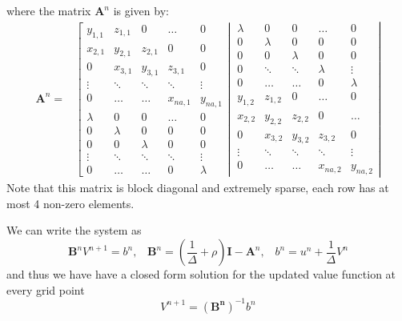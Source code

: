 \documentclass[12pt]{article}
\DeclareMathOperator{\1}{\mathbbm{1}}
\begin{document}
where the matrix $\mathbf{A}^n$ is given by:
\begin{align}\label{eq:sparseA}
	\mathbf{A}^n=&
	\left[\begin{matrix}
	y_{1,1} & z_{1,1} 	& 0 		& \ldots 	& 0 		\\
	x_{2,1} & y_{2,1} 	& z_{2,1} 	& 0 		& 0			\\
	0 		& x_{3,1} 	& y_{3,1} 	& z_{3,1} 	& 0			\\
	\vdots 	& \ddots 	& \ddots 	& \ddots 	& \vdots	\\
	0 		& \ldots 	& \ldots		& x_{na,1} 	& y_{na,1}	\\ \hline %
	\lambda & 0		 	& 0 		& \dots 	& 0 		\\ 
	0		& \lambda 	& 0		 	& 0 		& 0			\\
	0 		& 0		 	& \lambda 	& 0		 	& 0			\\
	\vdots 	& \ddots 	& \ddots  	& \ddots 	& \vdots	\\
	0 		& \ldots 	& \ldots		& 0 		& \lambda
	\end{matrix} \right| \
	\left.\begin{matrix}
	\lambda& 0		 	& 0 		& \ldots 	& 0 		\\
	0		& \lambda 	& 0		 	& 0 		& 0			\\
	0 		& 0		 	& \lambda 	& 0		 	& 0			\\
	0	 	& \ddots 	& \ddots  	& \lambda 	& \vdots	\\
	0 		& \ldots 	& \ldots		& 0 		& \lambda \\ \hline %
	y_{1,2} & z_{1,2} 	& 0 		& \dots 	& 0 		\\
	x_{2,2} & y_{2,2} 	& z_{2,2} 	& 0 		& \ldots		\\
	0 		& x_{3,2} 	& y_{3,2} 	& z_{3,2} 	& 0			\\
	\vdots 	& \ddots 	& \ddots 	& \ddots 	& \vdots	\\
	0 		& \ldots 	& \ldots		& x_{na,2} 	& y_{na,2}
	\end{matrix} \right|
	\end{align}
	Note that this matrix is block diagonal and extremely sparse, each row has at most 4 non-zero elements.
	
We can write the system as
	\begin{equation*}
	\mathbf{B}^nV^{n+1} = b^n, \;\;\; \mathbf{B}^n = \left(\frac{1}{\Delta} + \rho \right)\mathbf{I} - \mathbf{A}^n, \;\;\; b^n= u^n + \frac{1}{\Delta}V^n
	\end{equation*}
	and thus we have have a closed form solution for the updated value function at every grid point
\begin{equation} \label{eq:implicit}
	V^{n+1}= (\mathbf{B^n})^{-1} b^n
\end{equation}
\end{document}
